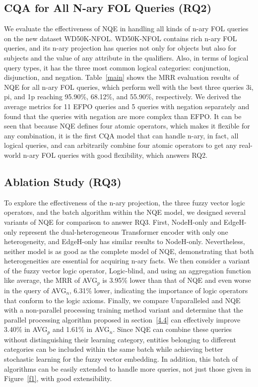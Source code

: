 \documentclass[letterpaper]{article} \usepackage{aaai23}  \usepackage{times}  \usepackage{helvet}  \usepackage{courier}  \usepackage[hyphens]{url}  \usepackage{graphicx} \urlstyle{rm} \def\UrlFont{\rm}  \usepackage{natbib}  \usepackage{caption} \frenchspacing  \setlength{\pdfpagewidth}{8.5in}  \setlength{\pdfpageheight}{11in}  \usepackage{algorithm}
\begin{document}
\subsection{CQA for All N-ary FOL Queries (RQ2)}
We evaluate the effectiveness of NQE in handling all kinds of n-ary FOL queries on the new dataset WD50K-NFOL. WD50K-NFOL contains rich n-ary FOL queries, and its n-ary projection has queries not only for objects but also for subjects and the value of any attribute in the qualifiers. Also, in terms of logical query types, it has the three most common logical categories: conjunction, disjunction, and negation. 
Table~\ref{main} shows the MRR evaluation results of NQE for all n-ary FOL queries, which perform well with the best three queries 3i, pi, and 1p reaching 95.90\%, 68.12\%, and 55.90\%, respectively. We derived the average metrics for 11 EFPO queries and 5 queries with negation separately and found that the queries with negation are more complex than EFPO. It can be seen that because NQE defines four atomic operators, which makes it flexible for any combination, it is the first CQA model that can handle n-ary, in fact, all logical queries, and can arbitrarily combine four atomic operators to get any real-world n-ary FOL queries with good flexibility, which answers RQ2.

\subsection{Ablation Study (RQ3)} 
To explore the effectiveness of the n-ary projection, the three fuzzy vector logic operators, and the batch algorithm within the NQE model, we designed several variants of NQE for comparison to answer RQ3. First, NodeH-only and EdgeH-only represent the dual-heterogeneous Transformer encoder with only one heterogeneity, and EdgeH-only has similar results to NodeH-only. Nevertheless, neither model is as good as the complete model of NQE, demonstrating that both heterogeneities are essential for acquiring n-ary facts. We then consider a variant of the fuzzy vector logic operator, Logic-blind, and using an aggregation function like average, the MRR of AVG$_p$ is 3.95\% lower than that of NQE and even worse in the query of AVG$_n$, 6.31\% lower, indicating the importance of logic operators that conform to the logic axioms. Finally, we compare Unparalleled and NQE with a non-parallel processing training method variant and determine that the parallel processing algorithm proposed in section~\ref{4.4} can effectively improve 3.40\% in AVG$_p$ and 1.61\% in AVG$_n$. Since NQE can combine these queries without distinguishing their learning category, entities belonging to different categories can be included within the same batch while achieving better stochastic learning for the fuzzy vector embedding. In addition, this batch of algorithms can be easily extended to handle more queries, not just those given in Figure~\ref{f1}, with good extensibility.
\end{document}
